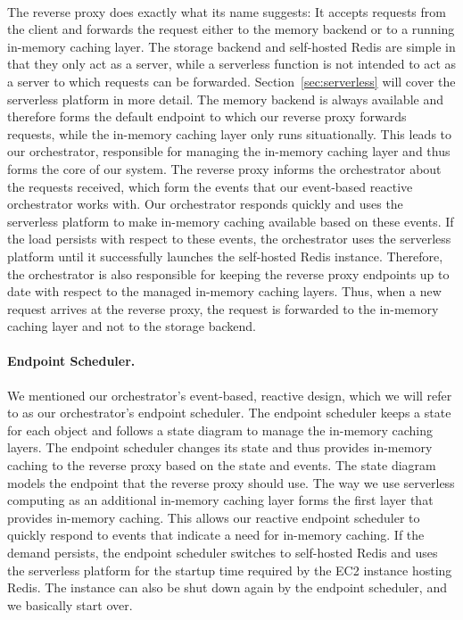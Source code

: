 ~\\
The reverse proxy does exactly what its name suggests: It accepts requests from the client and forwards the request either to the memory backend or to a running in-memory caching layer. The storage backend and self-hosted Redis are simple in that they only act as a server, while a serverless function is not intended to act as a server to which requests can be forwarded. Section~\ref{sec:serverless} will cover the serverless platform in more detail. The memory backend is always available and therefore forms the default endpoint to which our reverse proxy forwards requests, while the in-memory caching layer only runs situationally. This leads to our orchestrator, responsible for managing the in-memory caching layer and thus forms the core of our system. The reverse proxy informs the orchestrator about the requests received, which form the events that our event-based reactive orchestrator works with. Our orchestrator responds quickly and uses the serverless platform to make in-memory caching available based on these events. If the load persists with respect to these events, the orchestrator uses the serverless platform until it successfully launches the self-hosted Redis instance. Therefore, the orchestrator is also responsible for keeping the reverse proxy endpoints up to date with respect to the managed in-memory caching layers. Thus, when a new request arrives at the reverse proxy, the request is forwarded to the in-memory caching layer and not to the storage backend. 

\paragraph{Endpoint Scheduler.}
We mentioned our orchestrator's event-based, reactive design, which we will refer to as our orchestrator's endpoint scheduler. The endpoint scheduler keeps a state for each object and follows a state diagram to manage the in-memory caching layers. The endpoint scheduler changes its state and thus provides in-memory caching to the reverse proxy based on the state and events. The state diagram models the endpoint that the reverse proxy should use. The way we use serverless computing as an additional in-memory caching layer forms the first layer that provides in-memory caching. This allows our reactive endpoint scheduler to quickly respond to events that indicate a need for in-memory caching. If the demand persists, the endpoint scheduler switches to self-hosted Redis and uses the serverless platform for the startup time required by the EC2 instance hosting Redis. The instance can also be shut down again by the endpoint scheduler, and we basically start over. 
